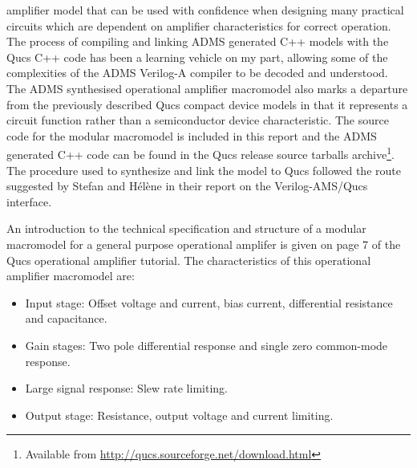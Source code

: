 amplifier model that can be used with confidence when designing many
practical circuits which are dependent on amplifier characteristics
for correct operation. The process of compiling and linking ADMS
generated C++ models with the Qucs C++ code has been a learning
vehicle on my part, allowing some of the complexities of the ADMS
Verilog-A compiler to be decoded and understood.  The ADMS synthesised
operational amplifier macromodel also marks a departure from the
previously described Qucs compact device models in that it represents
a circuit function rather than a semiconductor device characteristic.
The source code for the modular macromodel is included in this report
and the ADMS generated C++ code can be found in the Qucs release
source tarballs archive\footnote{Available from
\url{http://qucs.sourceforge.net/download.html}}. The procedure used to
synthesize and link the model to Qucs followed the route suggested by
Stefan and H\'{e}l\`{e}ne in their report on the Verilog-AMS/Qucs
interface.



An introduction to the technical specification and structure of a
modular macromodel for a general purpose operational amplifer is given
on page 7 of the Qucs operational amplifier tutorial. The
characteristics of this operational amplifier macromodel are:

\begin{itemize}
 \item Input stage: Offset voltage and current, bias current, differential resistance and capacitance.
 \item Gain stages: Two pole differential response and single zero common-mode response.
 \item Large signal response: Slew rate limiting.
 \item Output stage: Resistance, output voltage and current limiting.
\end{itemize}


